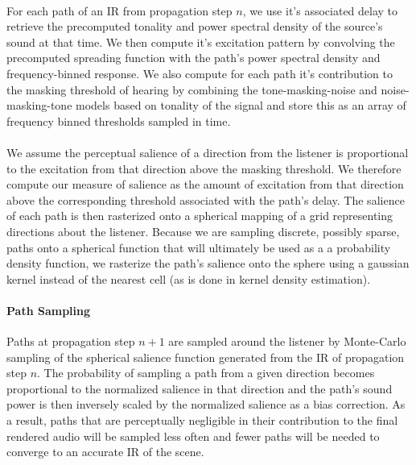 \paragraph{}
For each path of an IR from propagation step $n$, we use it's associated delay to retrieve the precomputed tonality
and power spectral density of the source's sound at that time.
We then compute it's excitation pattern by convolving the precomputed spreading function with the path's power 
spectral density and frequency-binned response.
We also compute for each path it's contribution to the masking threshold of hearing by combining the tone-masking-noise and noise-masking-tone models based on tonality of the signal and store this as an array
of frequency binned thresholds sampled in time.
\paragraph{}
We assume the perceptual salience of a direction from the listener is proportional to the excitation from that direction
above the masking threshold.
We therefore compute our measure of salience as the amount of excitation from that direction above 
the corresponding threshold associated with the path's delay.
The salience of each path is then rasterized onto a spherical mapping of a grid representing directions about the 
listener. 
Because we are sampling discrete, possibly sparse, paths onto a spherical function that will ultimately be used as a 
a probability density function, we rasterize the path's salience onto the sphere using a gaussian kernel 
instead of the nearest cell (as is done in kernel density estimation).
\paragraph{Path Sampling}
Paths at propagation step $n+1$ are sampled around the listener by Monte-Carlo sampling of the 
spherical salience function generated from the IR of propagation step $n$.
The probability of sampling a path from a given direction becomes proportional to the normalized 
salience in that direction and the path's sound power is then inversely scaled by the normalized 
salience as a bias correction.
As a result, paths that are perceptually negligible in their contribution to the final rendered audio 
will be sampled less often and fewer paths will be needed to converge to an accurate IR of the scene.
